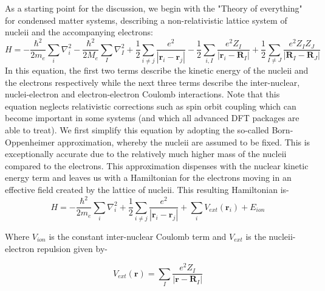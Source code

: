 \documentclass[12pt,a4paper]{article}
\newcommand{\rmb}{\mathbf{r}}
\begin{document}
As a starting point for the discussion, we begin with the "Theory of everything" for condensed matter systems, describing a non-relativistic lattice system of nucleii and the accompanying electrons:
\begin{equation}\label{DFT_1}
H=-\dfrac{\hbar^2}{2m_e}\sum_i\nabla_i^2  -\dfrac{\hbar^2}{2M_e}\sum_I\nabla_I^2 +\dfrac{1}{2}\sum_{i\neq j} \dfrac{e^2}{|\rmb_i -\rmb_j|}-\dfrac{1}{2}\sum_{i, I} \dfrac{e^2Z_I}{|\rmb_i -\mathbf{R}_I|} + \dfrac{1}{2}\sum_{I\neq J} \dfrac{e^2Z_I Z_J}{|\mathbf{R}_I -\mathbf{R}_J|} 
\end{equation}
In this equation, the first two terms describe the kinetic energy of the nucleii and the electrons respectively while the next three terms describe the inter-nuclear, nuclei-electron and electron-electron Coulomb interactions. Note that this equation neglects relativistic corrections such as spin orbit coupling which can become important in some systems (and which all advanced DFT packages are able to treat). We first simplify this equation by adopting the so-called Born-Oppenheimer approximation, whereby the nucleii are assumed to be fixed. This is exceptionally accurate due to the relatively much higher mass of the nucleii compared to the electrons. This approximation dispenses with the nuclear kinetic energy term and leaves us with a Hamiltonian for the electrons moving in an effective field created by the lattice of nucleii. This resulting Hamiltonian is-
\begin{equation}
H=-\dfrac{\hbar^2}{2m_e}\sum_i\nabla_i^2 + \dfrac{1}{2}\sum_{i\neq j} \dfrac{e^2}{|\rmb_i -\rmb_j|} +\sum_i V_{ext}(\rmb_i) +E_{ion}
\end{equation}

Where $V_{ion}$ is the constant inter-nuclear Coulomb term and $V_{ext}$ is the nucleii-electron repulsion given by-

\begin{equation}\label{DFT_2}
 V_{ext}(\rmb)= \sum_{I} \dfrac{e^2 Z_I}{|\rmb-\mathbf{R}_I|}
 \end{equation} 
\end{document}

